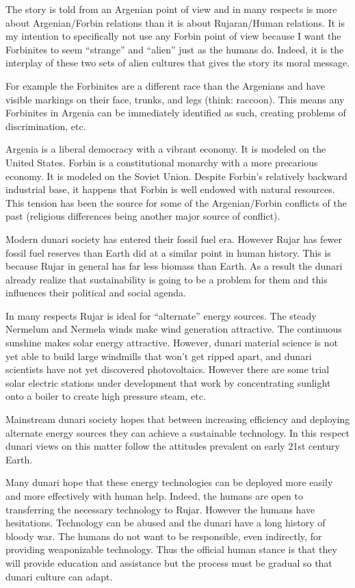 The story is told from an Argenian point of view and in many respects is more about
Argenian/Forbin relations than it is about Rujaran/Human relations. It is my intention to
specifically not use any Forbin point of view because I want the Forbinites to seem ``strange''
and ``alien'' just as the humans do. Indeed, it is the interplay of these two sets of alien
cultures that gives the story its moral message.

For example the Forbinites are a different race than the Argenians and have visible markings on
their face, trunks, and legs (think: raccoon). This means any Forbinites in Argenia can be
immediately identified as such, creating problems of discrimination, etc.

Argenia is a liberal democracy with a vibrant economy. It is modeled on the United States.
Forbin is a constitutional monarchy with a more precarious economy. It is modeled on the Soviet
Union. Despite Forbin's relatively backward industrial base, it happens that Forbin is well
endowed with natural resources. This tension has been the source for some of the Argenian/Forbin
conflicts of the past (religious differences being another major source of conflict).

Modern dunari society has entered their fossil fuel era. However Rujar has fewer fossil fuel
reserves than Earth did at a similar point in human history. This is because Rujar in general
has far less biomass than Earth. As a result the dunari already realize that sustainability is
going to be a problem for them and this influences their political and social agenda.

In many respects Rujar is ideal for ``alternate'' energy sources. The steady Nermelum and
Nermela winds make wind generation attractive. The continuous sunshine makes solar energy
attractive. However, dunari material science is not yet able to build large windmills that won't
get ripped apart, and dunari scientists have not yet discovered photovoltaics. However there are
some trial solar electric stations under development that work by concentrating sunlight onto a
boiler to create high pressure steam, etc.

Mainstream dunari society hopes that between increasing efficiency and deploying alternate
energy sources they can achieve a sustainable technology. In this respect dunari views on this
matter follow the attitudes prevalent on early 21st century Earth.

Many dunari hope that these energy technologies can be deployed more easily and more effectively
with human help. Indeed, the humans are open to transferring the necessary technology to
Rujar. However the humans have hesitations. Technology can be abused and the dunari have a
long history of bloody war. The humans do not want to be responsible, even indirectly, for
providing weaponizable technology. Thus the official human stance is that they will provide
education and assistance but the process must be gradual so that dunari culture can adapt.

